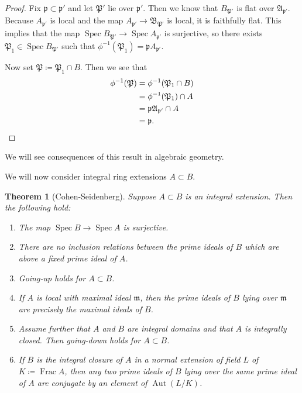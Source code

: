 \documentclass[leqno, openany]{memoir}
\newtheorem{thm}{Theorem}[section]
\theoremstyle{definition}
\theoremstyle{remark}
\theoremstyle{plain}
\theoremstyle{definition}
\theoremstyle{remark}
\newcommand{\mf}[1]{\mathfrak{#1}}
\DeclareMathOperator{\Aut}{Aut}
\DeclareMathOperator{\Spec}{Spec}
\begin{document}
\begin{proof}
    Fix $\mf{p} \subset \mf{p}'$ and let $\mf{P}'$ lie over $\mf{p}'$. Then we know that $B_{\mf{P}'}$ is flat over $\mf{A}_{\mf{p}'}$. Because $A_{\mf{p}'}$ is local and the map $A_{\mf{p}'} \to \mf{B}_{\mf{P}'}$ is local, it is faithfully flat. This implies that the map $\Spec B_{\mf{P}'} \to \Spec A_{\mf{p}'}$ is surjective, so there exists $\mf{P}_1 \in \Spec B_{\mf{P}'}$ such that $\phi^{-1}(\mf{P}_1) = \mf{p} A_{\mf{p}'}$. 

    Now set $\mf{P} \coloneqq \mf{P}_1 \cap B$. Then we see that
    \begin{align*}
        \phi^{-1}(\mf{P}) &= \phi^{-1}(\mf{P}_1 \cap B) \\
                          &= \phi^{-1}(\mf{P}_1) \cap A \\
                          &= \mf{p A_{\mf{p}'}} \cap A \\
                          &= \mf{p}. \qedhere
    \end{align*}
\end{proof}

We will see consequences of this result in algebraic geometry.

We will now consider integral ring extensions $A \subset B$.

\begin{thm}[Cohen-Seidenberg]
    Suppose $A \subset B$ is an integral extension. Then the following hold:
    \begin{enumerate}
        \item The map $\Spec B \to \Spec A$ is surjective.
        \item There are no inclusion relations between the prime ideals of $B$ which are above a fixed prime ideal of $A$.
        \item Going-up holds for $A \subset B$.
        \item If $A$ is local with maximal ideal $\mf{m}$, then the prime ideals of $B$ lying over $\mf{m}$ are precisely the maximal ideals of $B$.
        \item Assume further that $A$ and $B$ are integral domains and that $A$ is integrally closed. Then going-down holds for $A \subset B$.
        \item If $B$ is the integral closure of $A$ in a normal extension of field $L$ of $K \coloneqq \operatorname{Frac} A$, then any two prime ideals of $B$ lying over the same prime ideal of $A$ are conjugate by an element of $\Aut(L/K)$.
    \end{enumerate}
\end{thm}
\end{document}
